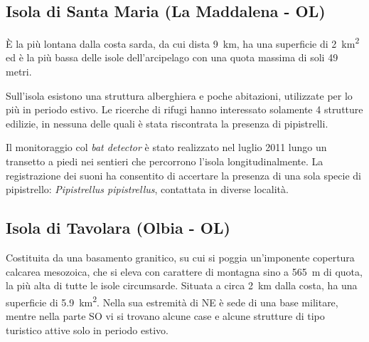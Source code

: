 \begin{multicols}{2}
\begin{compactdesc}
\subsection*{Isola di Santa Maria (La Maddalena - OL)}
È la più lontana dalla costa sarda, da cui dista 9~km, ha una superficie di \SI{2}{\square\kilo\meter} ed è la più bassa delle isole dell’arcipelago con una quota massima di soli 49 metri.

Sull’isola esistono una struttura alberghiera e poche abitazioni, utilizzate per lo più in periodo estivo.
Le ricerche di rifugi hanno interessato solamente 4 strutture edilizie, in nessuna delle quali è stata riscontrata la presenza di pipistrelli.

Il monitoraggio col \textit{bat detector} è stato realizzato nel luglio 2011 lungo un transetto a piedi nei sentieri che percorrono l’isola longitudinalmente. La registrazione dei suoni ha consentito di accertare la presenza di una sola specie di pipistrello: \emph{Pipistrellus pipistrellus}, contattata in diverse località.

\subsection*{Isola di Tavolara (Olbia - OL)}
Costituita da una basamento granitico, su cui si poggia un’imponente copertura calcarea mesozoica, che si eleva con carattere di montagna sino a 565~m di quota, la più alta di tutte le isole circumsarde. Situata a circa 2~km dalla costa, ha una superficie di \SI{5.9}{\square\kilo\meter}. Nella sua estremità di NE è sede di una base militare, mentre nella parte SO vi si trovano alcune case e alcune strutture di tipo turistico attive solo in periodo estivo.


\end{compactdesc}
\end{multicols}
